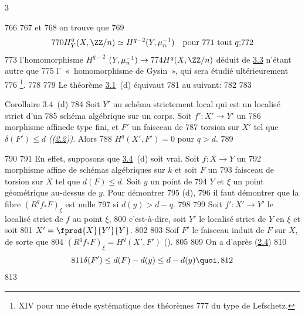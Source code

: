 3	\documentclass[10pt]{../fichiers-configuration-latex/smfart}
\begin{document}
   766	%
   767	et
   768	on trouve que
   769	$$
   770	H^{q}_Y(X,\ZZ/n)\simeq H^{q-2}(Y,\mu_n^{-1}) \mbox{\rm\quad pour
   771	tout $q$;}
   772	$$
   773	l'homomorphisme $H^{q-2}$ $(Y,\mu_n^{-1})\rightarrow
   774	H^{q}(X,\ZZ/n)$ déduit de \hyperref[XIV.cor3.3]{3.3} n'étant autre que 
   775	l'~« homomorphisme de Gysin », qui sera étudié ultérieurement
   776	\footnote[1]{\Cf {} XIV pour une étude systématique des théorèmes
   777	du type de Lefschetz.}.
   778	
   779	Le théorème \hyperref[XIV.thm3.1]{3.1}~(d) équivaut
   781	 au suivant:
   782	
   783	\begin{enonce*}{Corollaire 3.4~(d)}
   784	Soit $Y'$ un schéma strictement local qui est un localisé strict d'un
   785	schéma algébrique sur un corps. Soit $f':X'\rightarrow Y'$ un
   786	morphisme affine\pageoriginale de type fini, et $F'$ un faisceau de
   787	torsion sur $X'$ tel que $\delta(F')\leq d$ \emph{(\cf (\hyperref[XIV.def2.2]{2.2}))}. Alors
   788	$H^{q}(X',F')=0$ pour $q>d$.
   789	\end{enonce*}
   790	
   791	En effet, supposons que \hyperref[XIV.cor3.4]{3.4}~(d) soit vrai. Soit $f:X\rightarrow Y$ un
   792	morphisme affine de schémas algébriques sur $k$ et soit $F$ un
   793	faisceau de torsion sur $X$ tel que $d(F)\leq d$. Soit $y$ un point de
   794	$Y$ et $\xi$ un point géométrique au-dessus de $y$. Pour démontrer 
   795	 (d), 
   796	il faut démontrer que la fibre $(R^{q}f_{\ast}F)_{\xi}$ est nulle
   797	si $d(y)>d-q$.
   798	
   799	Soit $f':X'\rightarrow Y'$ le localisé strict de $f$ au point $\xi$,
   800	c'est-à-dire, soit $Y'$ le localisé strict de $Y$ en $\xi$ et soit
   801	$X'=\fprod{X}{Y'}{Y}$.
   802	
   803	Soif $F'$ le faisceau induit de $F$ sur $X$, de sorte que
   804	$(R^{q}f_{\ast}F)_{\xi}=H^{q}(X',F')$ (). 
   805	
   809	{On a d'après (\hyperref[XIV.prop2.4]{2.4})
   810	$$
   811	\delta(F')\leq d(F)-d(y)\leq d-d(y){\quoi},
   812	$$}
   813	%
\end{document}
